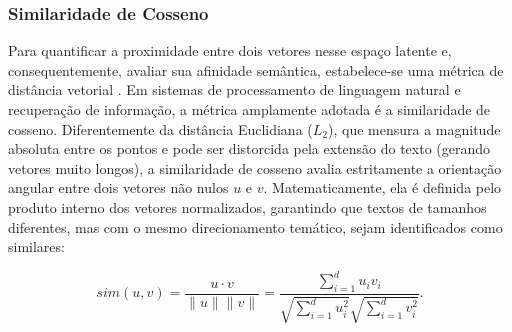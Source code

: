 \subsubsection{Similaridade de Cosseno}

Para quantificar a proximidade entre dois vetores nesse espaço latente e, consequentemente, avaliar sua afinidade semântica, estabelece-se uma métrica de distância vetorial \citep{manning2008}. Em sistemas de processamento de linguagem natural e recuperação de informação, a métrica amplamente adotada é a similaridade de cosseno. Diferentemente da distância Euclidiana ($L_2$), que mensura a magnitude absoluta entre os pontos e pode ser distorcida pela extensão do texto (gerando vetores muito longos), a similaridade de cosseno avalia estritamente a orientação angular entre dois vetores não nulos $u$ e $v$. Matematicamente, ela é definida pelo produto interno dos vetores normalizados, garantindo que textos de tamanhos diferentes, mas com o mesmo direcionamento temático, sejam identificados como similares:

\begin{equation}
  sim(u, v) = \frac{u \cdot v}{\|u\| \|v\|} = \frac{\sum_{i=1}^{d} u_i v_i}{\sqrt{\sum_{i=1}^{d} u_i^2} \sqrt{\sum_{i=1}^{d} v_i^2}}.
\end{equation}
